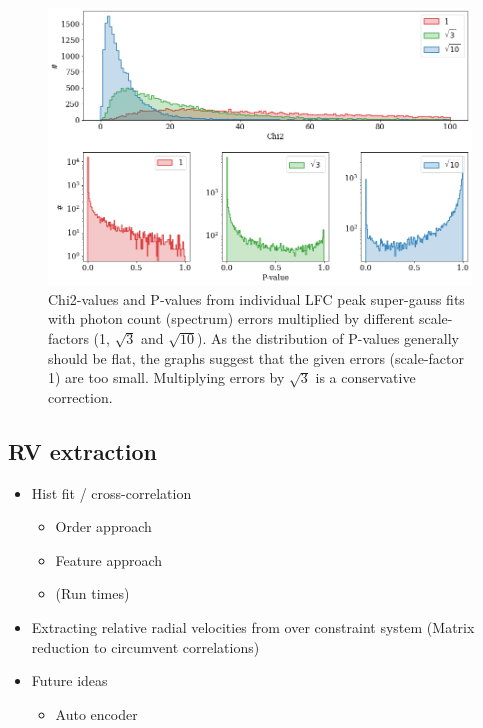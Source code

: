     \begin{figure}[ht]
        \centering
        \includegraphics[scale=0.40]{figures/calib_errors.png}
        \caption{Chi2-values and P-values from individual LFC peak super-gauss fits with photon count (spectrum) errors multiplied by different scale-factors (1, $\sqrt{3}$ and $\sqrt{10}$). As the distribution of P-values generally should be flat, the graphs suggest that the given errors (scale-factor 1) are too small. Multiplying errors by $\sqrt{3}$ is a conservative correction.}
        \label{fig:calib_errors}
    \end{figure}




\subsection{RV extraction}





    \begin{itemize}
        \item Hist fit / cross-correlation
        \begin{itemize}
            \item Order approach
            \item Feature approach
            \item (Run times)
        \end{itemize}
        \item Extracting relative radial velocities from over constraint system (Matrix reduction to circumvent correlations)
        \item Future ideas
        \begin{itemize}
            \item Auto encoder
        \end{itemize}
    \end{itemize}

